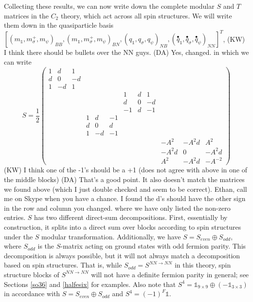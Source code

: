 \documentclass[12pt,a4paper]{article}
\newcounter{arrow}
\newcommand{\ra}{\rightarrow}
\newcommand{\unit}{\mathds{1}}
\newcommand\be            {\begin{equation}}
\newcommand\ee            {\end{equation}}
\newcommand{\kw}[1]{{\color{kwcolor}\footnotesize{(KW) #1}}}
\newcommand{\dave}[1]{{\color{ao(english)}\footnotesize{(DA) #1}}}
\begin{document}
Collecting these results, we can now write down the complete modular $S$ and $T$ matrices in the $C_2$ theory, 
which act across all spin structures. 
We will write them down in the quasiparticle 
basis $[(m_\unit,m_\sigma^+,m_\psi)_{BB},(m_\unit,m_\sigma^+,m_\psi)_{BN},(q_\unit,q_\sigma,q_\psi)_{NB},(\overset{\bullet}{q}_\unit,\overset{\bullet}{q}_\sigma,\overset{\bullet}{q}_\psi)_{NN}]^T$, 
\kw{I think there should be bullets over the NN guys.}
\dave{Yes, changed.
}
in which we can write
\be \label{modularS}
S = \frac{1}{2}\begin{pmatrix} 1 & d & 1 &			&&&			&&&			&& \\ 
					      d & 0 &-d &			&&&			&&&			&&\\
					      1&-d&1 & 			&&&			&&&			&&\\
						&&&				&&&			1&d&1&		&& \\
						&&&				&&&			d&0&-d&		&&\\ %
						&&&				&&&			-1&d&-1&		&&\\
						&&&				1&d&-1&		&&&			&&\\ %
						&&&				d&0&d&		&&&			&&\\
						&&&				1&-d&-1&		&&&			&&\\ %
						&&&				&&&			&&&			-A^{2} & -A^{2}d & A^{2}\\
						&&&				&&&			&&&			-A^{2}d & 0 & -A^{2}d \\ 
						&&&				&&&			&&&			A^{2} & -A^{2}d & -A^{-2} \end{pmatrix}\ee		
\kw{I think one of the -1's should be a +1 (does not agree with above in one of the middle blocks)}
\dave{That's a good point. 
It also doesn't match the matrices we found above (which I just double checked and seem to be correct).
Ethan, call me on Skype when you have a chance. 
I found the d's should have the other sign in the row and column you changed.}
where we have only listed the non-zero entries. 
$S$ has two different direct-sum decompositions. First, essentially by construction, 
it splits into a direct sum over blocks according to spin structures 
under the $S$ modular transformation. 
Additionally, we have $S = S_{even} \oplus S_{odd}$, where $S_{odd}$ is the $S$-matrix 
acting on ground states with odd fermion parity.
This decomposition is always possible, but it will not always match a decomposition based 
on spin structures. 
That is, while $S_{odd} = S^{NN\ra NN}$ in this theory, spin structure blocks of $S^{NN\ra NN}$ 
will not have a definite fermion parity in general; see Sections \ref{so36} and \ref{halfesix} for examples. 
Also note that $S^4 = \unit_{9\times9}\oplus(-\unit_{3\times3})$ in accordance with $S = S_{even} \oplus S_{odd}$ and $S^4=(-1)^F\unit$. 
\end{document}
